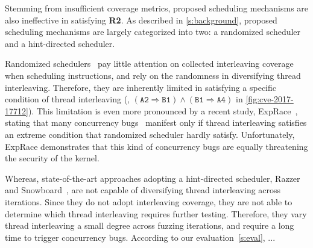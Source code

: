 

%
Stemming from insufficient coverage metrics, proposed scheduling
mechanisms are also ineffective in satisfying \textbf{R2}.
%
As described in \autoref{s:background}, proposed scheduling mechanisms
are largely categorized into two: a randomized scheduler and a
hint-directed scheduler.

%
Randomized schedulers~\cite{krace, pctalgorithm, muzz, ski} pay little
attention on collected interleaving coverage when scheduling
instructions, and rely on the randomness in diversifying thread
interleaving.
%
Therefore, they are inherently limited in satisfying a specific
condition of thread interleaving (\eg,
$(\texttt{A2} \Rightarrow \texttt{B1}) \wedge (\texttt{B1} \Rightarrow
\texttt{A4})$ in \autoref{fig:cve-2017-17712}).
%
This limitation is even more pronounced by a recent study,
ExpRace~\cite{exprace}, stating that many concurrency
bugs~\cite{cve20196974, cve20191999, cve201911486} manifest only if
thread interleaving satisfies an extreme condition that randomized
scheduler hardly satisfy.
%
Unfortunately, ExpRace demonstrates that this kind of concurrency bugs
are equally threatening the security of the kernel.


Whereas, state-of-the-art approaches adopting a hint-directed
scheduler, Razzer~\cite{razzer} and Snowboard~\cite{snowboard}, are
not capable of diversifying thread interleaving across iterations.
%
Since they do not adopt interleaving coverage, they are not able to
determine which thread interleaving requires further
testing. Therefore, they vary thread interleaving a small degree
across fuzzing iterations, and require a long time to trigger
concurrency bugs.
%
According to our evaluation~\autoref{s:eval}, ...






